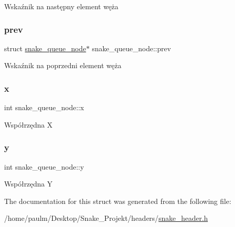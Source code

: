 Wskaźnik na następny element węża \mbox{\label{structsnake__queue__node_a4d5771c990e125457af48d355a33d524}} 
\subsubsection{\texorpdfstring{prev}{prev}}
{\footnotesize\ttfamily struct \mbox{\hyperlink{structsnake__queue__node}{snake\+\_\+queue\+\_\+node}}$\ast$ snake\+\_\+queue\+\_\+node\+::prev}

Wskaźnik na poprzedni element węża \mbox{\label{structsnake__queue__node_a1efd876ed3160690812ada8ebb8a966b}} 
\subsubsection{\texorpdfstring{x}{x}}
{\footnotesize\ttfamily int snake\+\_\+queue\+\_\+node\+::x}

Współrzędna X \mbox{\label{structsnake__queue__node_a33fca17abd7a835bd1f302706192bf03}} 
\subsubsection{\texorpdfstring{y}{y}}
{\footnotesize\ttfamily int snake\+\_\+queue\+\_\+node\+::y}

Współrzędna Y 

The documentation for this struct was generated from the following file\+:\begin{DoxyCompactItemize}
\item 
/home/paulm/\+Desktop/\+Snake\+\_\+\+Projekt/headers/\mbox{\hyperlink{snake__header_8h}{snake\+\_\+header.\+h}}\end{DoxyCompactItemize}
